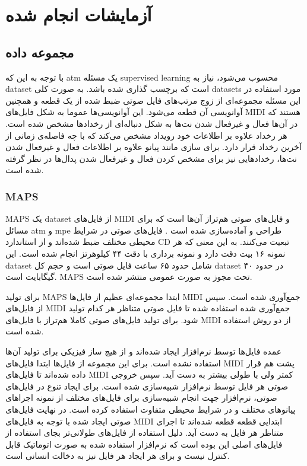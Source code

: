 \chapter{آزمایشات انجام شده}
\section{مجموعه داده}
با توجه به این که \gls{atm} یک مسئله \gls{supervised learning} محسوب می‌شود،
نیاز به \gls{dataset} است که برچسب گذاری شده باشد. به صورت کلی \glspl{dataset}
مورد استفاده در این مسئله مجموعه‌ای از زوج مرتب‌های فایل صوتی ضبط شده از یک قطعه
و همچنین آوانویسی آن قطعه می‌شود. این آوانویسی‌ها عموما به شکل فایل‌های
\gls{MIDI} هستند که در آن‌ها فعال و غیرفعال شدن نت‌ها به شکل دنباله‌ای از
رخدادها مشخص شده است. هر رخداد علاوه بر اطلاعات خود رویداد مشخص می‌کند که با چه
فاصله‌ی زمانی از آخرین رخداد قرار دارد. برای سازی مانند پیانو علاوه بر اطلاعات
فعال و غیرفعال شدن نت‌ها، رخدادهایی نیز برای مشخص کردن فعال و غیرفعال شدن
پدال‌ها در نظر گرفته شده است.

\subsection{MAPS}
MAPS یک \gls{dataset} از فایل‌های \gls{MIDI} و فایل‌های صوتی هم‌تراز آن‌ها است
که برای مسائل \gls{atm} و \gls{mpe} طراحی و آماده‌سازی شده است
\cite{emiya2009multipitch}. فایل‌های صوتی در شرایط محیطی مختلف ضبط شده‌اند و از
استاندارد CD تبعیت می‌کنند. به این معنی که هر نمونه ۱۶ بیت دقت دارد و نمونه
برداری با دقت ۴۴ کیلوهرتز انجام شده است. این \gls{dataset} شامل حدود ۶۵ ساعت
فایل صوتی است و حجم کل \gls{dataset} در حدود ۴۰ گیگابایت است. MAPS تحت مجوز
 به صورت عمومی منتشر شده است.

برای تولید MAPS ابتدا مجموعه‌ای عظیم از فایل‌ها \gls{MIDI} جمع‌آوری شده است. سپس
از فایل‌های \gls{MIDI} جمع‌آوری شده استفاده شده تا فایل صوتی متناظر هر کدام
تولید شود. برای تولید فایل‌های صوتی کاملا هم‌تراز با فایل‌های \gls{MIDI} از دو
روش استفاده شده است.

عمده فایل‌ها توسط نرم‌افزار ایجاد شده‌اند و از هیچ ساز فیزیکی برای تولید آن‌ها
استفاده نشده است. برای این مجموعه از فایل‌ها ابتدا فایل‌های \gls{MIDI} پشت هم
قرار داده شده‌اند تا فایل‌های \gls{MIDI} کمتر ولی با طولی بیشتر به دست آید. سپس
خروجی صوتی هر فایل توسط نرم‌افزار  شبیه‌سازی شده است.
برای ایجاد تنوع در فایل‌های صوتی، نرم‌افزار جهت انجام شبیه‌سازی برای فایل‌های
مختلف از نمونه اجراهای پیانوهای مختلف و در شرایط محیطی متفاوت استفاده کرده است.
در نهایت فایل‌های صوتی ایجاد شده با توجه به فایل‌های \gls{MIDI} ابتدایی قطعه
قطعه شده‌اند تا اجرای متناظر هر فایل به دست آید. دلیل استفاده از فایل‌های
طولانی‌تر بجای استفاده از فایل‌های اصلی این بوده است که نرم‌افزار استفاده شده به
صورت اتوماتیک قابل کنترل نیست و برای هر ایجاد هر فایل نیز به دخالت انسانی است.

